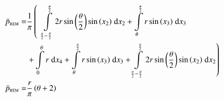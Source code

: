 \begin{align}
    \bar{p}_{\text{\tiny{REM}}} =&\frac{1}{\pi} \left(\;\;\int\limits_{\frac{\pi}{2} - \frac{\theta}{2}}^{\frac{\pi}{2}}2 r \sin{\left (\frac{\theta}{2} \right )} \sin{\left (x_{2} \right )}\;\mathrm{d}x_{2}+\int\limits_{\theta}^{\frac{\pi}{2}}r \sin{\left (x_{3} \right )}\;\mathrm{d}x_{3}\right.\notag\\
 &\left.+\int\limits_{0}^{\theta}r\;\mathrm{d}x_{4}+\int\limits_{\theta}^{\frac{\pi}{2}}r \sin{\left (x_{3} \right )}\;\mathrm{d}x_{3}+\int\limits_{\frac{\pi}{2} - \frac{\theta}{2}}^{\frac{\pi}{2}}2 r \sin{\left (\frac{\theta}{2} \right )} \sin{\left (x_{2} \right )}\;\mathrm{d}x_{2}\right)\label{pREMDef}\\
    \bar{p}_{\text{\tiny{REM}}}  =& \frac{r}{\pi} \left(\theta + 2\right)\label{pREMSln}
\end{align}